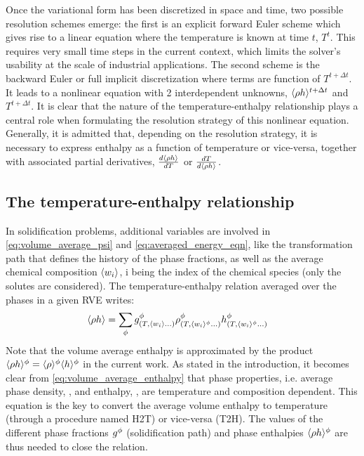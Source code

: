 Once the variational form has been discretized in space and time, two possible resolution schemes emerge: the first is an 
explicit forward Euler scheme which gives rise to a linear equation where the temperature is known at time $t$, $T^t$. This requires very small 
time steps in the current context, which limits the solver’s usability at the scale of industrial applications. The second scheme is the 
backward Euler or full implicit discretization where terms are function of $T^{t+\Delta t}$. It leads to a nonlinear equation with 2 interdependent 
unknowns, $\langle  \rho h  \rangle^{t+\Delta t}$ and  $T^{t+\Delta t}$. It is clear that the nature of the temperature-enthalpy relationship plays a central 
role when formulating the resolution strategy of this nonlinear equation. Generally, it is admitted that, depending on the resolution strategy, 
it is necessary to express enthalpy as a function of temperature or vice-versa, together with associated partial derivatives, 
$\frac{d \langle  \rho h  \rangle}{dT}$ or $\frac{dT }{d \langle  \rho h  \rangle}$.

\subsection{The temperature-enthalpy relationship} 
In solidification problems, additional variables are involved in \autoref{eq:volume_average_psi} and \autoref{eq:averaged_energy_eqn}, 
like the transformation path that defines the history of the phase fractions, as well as the average chemical composition $\langle w_i \rangle$, 
i being the index of the chemical species (only the solutes are considered). The temperature-enthalpy relation averaged over the 
phases in a given RVE writes:
\begin{align}
\label{eq:volume_average_enthalpy}
& \rh = \sum_\phi \gphi_{\brac{T, \wi \dots}} \rphi_{\brac{T, \wi^{\phi} \dots}} \hphi_{\brac{T, \wi^{\phi} \dots}}
\end{align}
Note that the volume average enthalpy is approximated by the product $\langle \rho h \rangle^{\phi}=\langle \rho \rangle^{\phi}\langle h \rangle^{\phi}$ in the current work. As stated 
in the introduction, it becomes clear from \autoref{eq:volume_average_enthalpy} that phase properties, i.e. average phase density, , \rphi and enthalpy, \hphi, 
are temperature and composition dependent. This equation is the key to convert the average volume enthalpy to temperature (through a procedure named H2T) 
or vice-versa (T2H). The values of the different phase fractions $g^{\phi} $ (solidification path) and phase enthalpies $\langle  \rho h  \rangle^{\phi}$ are thus needed 
to close the relation.

